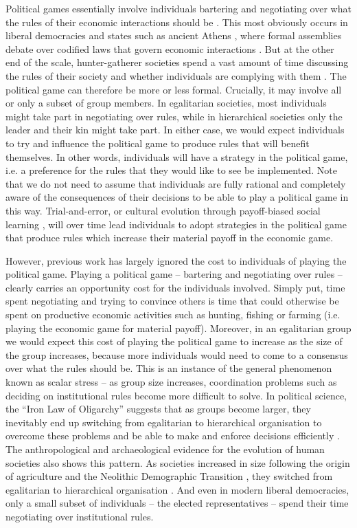 \documentclass{rstb}
\begin{document}
\begin{linenumbers}
Political games essentially involve individuals bartering and negotiating over what the rules of their economic interactions should be \cite{Powers:2016:a}. This most obviously occurs in liberal democracies and states such as ancient Athens \cite{Ober:2008:a}, where formal assemblies debate over codified laws that govern economic interactions \cite{Reiter:1996:a}. But at the other end of the scale, hunter-gatherer societies spend a vast amount of time discussing the rules of their society and whether individuals are complying with them \cite{Boehm:1999:a}. The political game can therefore be more or less formal. Crucially, it may involve all or only a subset of group members. In egalitarian societies, most individuals might take part in negotiating over rules, while in hierarchical societies only the leader and their kin might take part. In either case, we would expect individuals to try and influence the political game to produce rules that will benefit themselves. In other words, individuals will have a strategy in the political game, i.e. a preference for the rules that they would like to see be implemented. Note that we do not need to assume that individuals are fully rational and completely aware of the consequences of their decisions to be able to play a political game in this way. Trial-and-error, or cultural evolution through payoff-biased social learning \cite{Boyd:1985:a}, will over time lead individuals to adopt strategies in the political game that produce rules which increase their material payoff in the economic game. 

However, previous work has largely ignored the cost to individuals of playing the political game. Playing a political game -- bartering and negotiating over rules -- clearly carries an opportunity cost for the individuals involved. Simply put, time spent negotiating and trying to convince others is time that could otherwise be spent on productive economic activities such as hunting, fishing or farming (i.e. playing the economic game for material payoff). Moreover, in an egalitarian group we would expect this cost of playing the political game to increase as the size of the group increases, because more individuals would need to come to a consensus over what the rules should be. This is an instance of the general phenomenon known as scalar stress \cite{Johnson:1982:a} -- as group size increases, coordination problems such as deciding on institutional rules become more difficult to solve. In political science, the ``Iron Law of Oligarchy'' suggests that as groups become larger, they inevitably end up switching from egalitarian to hierarchical organisation to overcome these problems and be able to make and enforce decisions efficiently \cite{Michels:1911:a}. The anthropological and archaeological evidence for the evolution of human societies also shows this pattern. As societies increased in size following the origin of agriculture and the Neolithic Demographic Transition \cite{Bocquet-Appel:2011:a}, they switched from egalitarian to hierarchical organisation \cite{Boehm:1999:a,Price:1995:a,Price:2010:a}. And even in modern liberal democracies, only a small subset of individuals -- the elected representatives -- spend their time negotiating over institutional rules.


\end{linenumbers}
\end{document}
